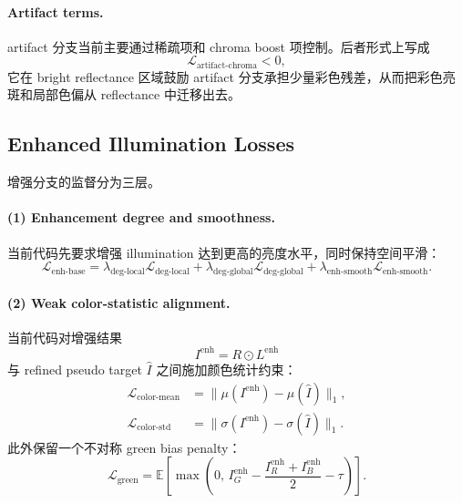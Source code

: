 \documentclass[11pt]{article}
\begin{document}
\paragraph{Artifact terms.}
artifact 分支当前主要通过稀疏项和 chroma boost 项控制。后者形式上写成
\begin{equation}
    \mathcal{L}_{\text{artifact-chroma}} < 0,
\end{equation}
它在 bright reflectance 区域鼓励 artifact 分支承担少量彩色残差，从而把彩色亮斑和局部色偏从 reflectance 中迁移出去。

\subsection{Enhanced Illumination Losses}

增强分支的监督分为三层。

\paragraph{(1) Enhancement degree and smoothness.}
当前代码先要求增强 illumination 达到更高的亮度水平，同时保持空间平滑：
\begin{equation}
    \mathcal{L}_{\text{enh-base}}
    =
    \lambda_{\text{deg-local}}\mathcal{L}_{\text{deg-local}}
    +
    \lambda_{\text{deg-global}}\mathcal{L}_{\text{deg-global}}
    +
    \lambda_{\text{enh-smooth}}\mathcal{L}_{\text{enh-smooth}}.
\end{equation}

\paragraph{(2) Weak color-statistic alignment.}
当前代码对增强结果
\begin{equation}
    I^{\text{enh}} = R \odot L^{\text{enh}}
\end{equation}
与 refined pseudo target $\hat{I}$ 之间施加颜色统计约束：
\begin{align}
    \mathcal{L}_{\text{color-mean}}
    &= \|\mu(I^{\text{enh}}) - \mu(\hat{I})\|_1, \\
    \mathcal{L}_{\text{color-std}}
    &= \|\sigma(I^{\text{enh}}) - \sigma(\hat{I})\|_1.
\end{align}
此外保留一个不对称 green bias penalty：
\begin{equation}
    \mathcal{L}_{\text{green}}
    =
    \mathbb{E}\left[
        \max\left(
            0,\,
            I^{\text{enh}}_G
            -
            \frac{I^{\text{enh}}_R + I^{\text{enh}}_B}{2}
            -
            \tau
        \right)
    \right].
\end{equation}
\end{document}
